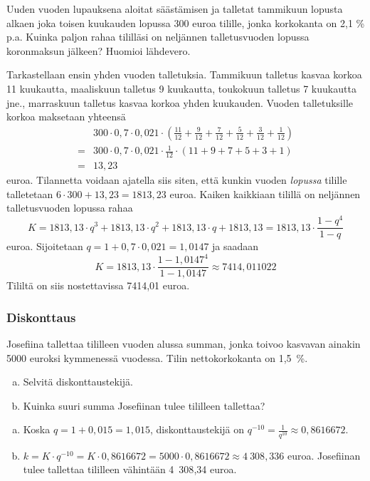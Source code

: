 \documentclass[a4paper,10pt]{article}\usepackage[]{graphicx}\usepackage[]{color}
\begin{document}
\begin{question} Uuden vuoden lupauksena aloitat säästämisen ja talletat tammikuun lopusta alkaen joka toisen kuukauden lopussa 300 euroa tilille,
jonka korkokanta on 2{,}1 \% p.a. Kuinka paljon rahaa tililläsi on neljännen talletusvuoden lopussa koronmaksun jälkeen? Huomioi lähdevero.
\end{question}\begin{solution}
Tarkastellaan ensin yhden vuoden talletuksia. Tammikuun talletus kasvaa korkoa 11 kuukautta, maaliskuun talletus 9 kuukautta,
toukokuun talletus 7 kuukautta jne., marraskuun talletus kasvaa korkoa yhden kuukauden. Vuoden talletuksille korkoa maksetaan yhteensä
\begin{align*}
    &300\cdot0,7\cdot0,021\cdot\left(\frac{11}{12} + \frac{9}{12} + \frac{7}{12} + \frac{5}{12} + \frac{3}{12} + \frac{1}{12}\right)\\
    =&300\cdot0,7\cdot0,021\cdot\frac{1}{12}\cdot(11+9+7+5+3+1)\\
    =& 13,23
\end{align*}
euroa. Tilannetta voidaan ajatella siis siten, että kunkin vuoden \emph{lopussa} tilille talletetaan \(6\cdot300+13,23 = 1813,23\) euroa.
Kaiken kaikkiaan tilillä on neljännen talletusvuoden lopussa rahaa
\[
    K = 1813,13\cdot q^3 + 1813,13\cdot q^2 + 1813,13\cdot q + 1813,13 = 1813,13\cdot\frac{1-q^4}{1-q}
\]
euroa. Sijoitetaan \(q = 1 + 0,7\cdot0,021 = 1,0147\) ja saadaan
\[
    K = 1813,13\cdot\frac{1-1,0147^4}{1-1,0147} \approx 7414,011022
\]
Tililtä on siis nostettavissa 7414,01 euroa.
\end{solution}

\subsubsection*{Diskonttaus}

\begin{question} Josefiina tallettaa tililleen vuoden alussa summan, jonka toivoo kasvavan ainakin 5000 euroksi kymmenessä vuodessa. Tilin nettokorkokanta on 1,5~\%.
\begin{enumerate}[(a)]
    \item Selvitä diskonttaustekijä.
    \item Kuinka suuri summa Josefiinan tulee tililleen tallettaa?
\end{enumerate}
\end{question}\begin{solution}
    \begin{enumerate}[(a)]
        \item Koska \(q = 1 + 0,015 = 1,015\), diskonttaustekijä on \(q^{-10} = \frac{1}{q^{10}}\approx 0{,}8616672\).
        \item \(k = K\cdot q^{-10} = K\cdot 0{,}8616672 = 5000\cdot 0{,}8616672\approx 4~308{,}336\) euroa.
        Josefiinan tulee tallettaa tililleen vähintään 4~308{,}34 euroa.
    \end{enumerate}
\end{solution}
\end{document}
